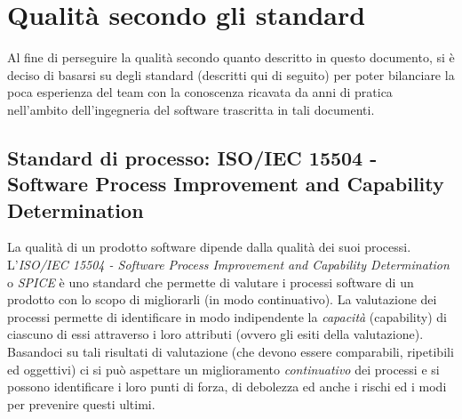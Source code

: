 \section{Qualità secondo gli standard}
Al fine di perseguire la qualità secondo quanto descritto in questo documento, si è deciso di basarsi su degli standard (descritti qui di seguito) per poter bilanciare la poca esperienza del team con la conoscenza ricavata da anni di pratica nell'ambito dell'ingegneria del software trascritta in tali documenti.
\subsection{Standard di processo: ISO/IEC 15504 - Software Process Improvement and Capability Determination}
\label{AppA:standardProc}
La qualità di un prodotto software dipende dalla qualità dei suoi processi.
L'\emph{ISO/IEC 15504 - Software Process Improvement and Capability Determination} o \emph{SPICE} è uno standard che permette di valutare i processi software di un prodotto con lo scopo di migliorarli  (in modo continuativo). La valutazione dei processi permette di identificare in modo indipendente la \emph{capacità} (capability) di ciascuno di essi attraverso i loro attributi (ovvero gli esiti della valutazione). Basandoci su tali risultati di valutazione (che devono essere comparabili, ripetibili ed oggettivi) ci si può aspettare un miglioramento \emph{continuativo} dei processi e si possono identificare i loro punti di forza, di debolezza ed anche i rischi ed i modi per prevenire questi ultimi.

